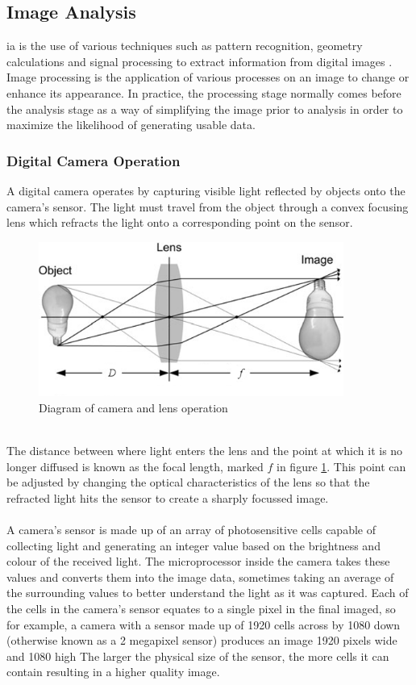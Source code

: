 \subsection{Image Analysis}
	\gls{ia} is the use of various techniques such as pattern recognition, geometry calculations and signal processing to extract information from digital images . Image processing is the application of various processes on an image to change or enhance its appearance. In practice, the processing stage normally comes before the analysis stage as a way of simplifying the image prior to analysis in order to maximize the likelihood of generating usable data.
	\subsubsection{Digital Camera Operation}
		A digital camera operates by capturing visible light reflected by objects onto the camera’s sensor. The light must travel from the object through a convex focusing lens which refracts the light onto a corresponding point on the sensor.
		\begin{figure}[h!]
			\centering
			\includegraphics[width=10cm]{../images/camera_bulb.PNG}
			\caption{Diagram of camera and lens operation \citep{introtoprocessing}}
			\label{fig:camera_diagram}
		\end{figure}
		\\
		The distance between where light enters the lens and the point at which it is no longer diffused is known as the focal length, marked $f$ in figure \ref{fig:camera_diagram}. This point can be adjusted by changing the optical characteristics of the lens so that the refracted light hits the sensor to create a sharply focussed image.
		\\\\
		A camera’s sensor is made up of an array of photosensitive cells capable of collecting light and generating an integer value based on the brightness and colour of the received light. The microprocessor inside the camera takes these values and converts them into the image data, sometimes taking an average of the surrounding values to better understand the light as it was captured. Each of the cells in the camera’s sensor equates to a single pixel in the final imaged, so for example, a camera with a sensor made up of 1920 cells across by 1080 down (otherwise known as a 2 megapixel sensor) produces an image 1920 pixels wide and 1080 high The larger the physical size of the sensor, the more cells it can contain resulting in a higher quality image.
